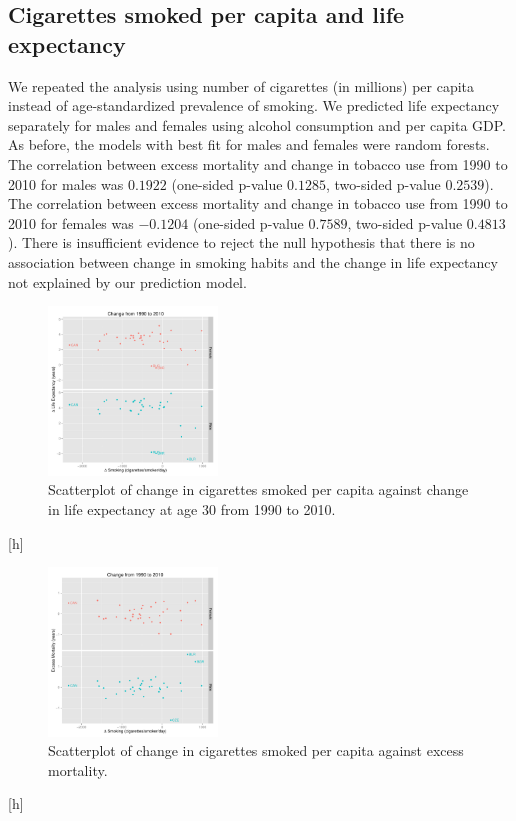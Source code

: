 \documentclass{article}
\begin{document}
\clearpage
\subsection{Cigarettes smoked per capita and life expectancy}
We repeated the analysis using number of cigarettes (in millions) per capita instead of age-standardized prevalence of smoking.  We predicted life expectancy separately for males and females using alcohol consumption and per capita GDP.  As before, the models with best fit for males and females were random forests.  The correlation between excess mortality and change in tobacco use from 1990 to 2010 for males was $0.1922$ (one-sided p-value $0.1285$, two-sided p-value $0.2539$).  The correlation between excess mortality and change in tobacco use from 1990 to 2010 for females was $-0.1204$ (one-sided p-value $0.7589$, two-sided p-value $0.4813$).  There is insufficient evidence to reject the null hypothesis that there is no association between change in smoking habits and the change in life expectancy not explained by our prediction model.


\begin{figure}[h]
\centering
\includegraphics[width = 0.4\textwidth]{smoking_lifeexp2.pdf}
\caption{Scatterplot of change in cigarettes smoked per capita against change in life expectancy at age 30 from 1990 to 2010.}\label{fig:smoking_lifeexp2}
\end{figure}[h]

\begin{figure}[h]
\centering
\includegraphics[width = 0.4\textwidth]{smoking_exmort2.pdf}
\caption{Scatterplot of change in cigarettes smoked per capita against excess mortality.}\label{fig:smoking_excessmortality2}
\end{figure}[h]
\end{document}
